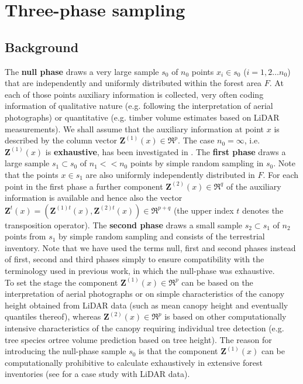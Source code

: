 \documentclass[a4paper,12pt,leqno, titlepage]{article}
\begin{document}
 \clearpage \newpage
\section{Three-phase sampling}\label{threephase}
\subsection{Background}\label{background}
The \textbf{null phase} draws a very large sample $s_0$ of $n_0$ points
$x_{i}\in{s_0}$ ($i=1,2\ldots n_0$) that are independently and uniformly distributed
within the forest area $F$. At each of those points auxiliary
information is collected, very often coding information of qualitative nature
(e.g. following the  interpretation of aerial photographs) or quantitative (e.g. timber volume estimates  based on LiDAR measurements). We shall assume that the auxiliary information at point $x$
is described by the column vector $\pmb{Z}^{(1)}(x)\in{\Re^p}$. The case $n_0=\infty$, i.e. $\pmb{Z}^{(1)}(x)$ is  \textbf{exhaustive}, has been investigated in \cite{mandallaz4}. The \textbf{first phase} draws a large sample $s_1 \subset s_0$ of $n_1 <<n_0$ points by simple random sampling in $s_0$. Note that the points $x\in{s_1}$ are also uniformly independently distributed in $F$. For each point in the first phase a further component $\pmb{Z}^{(2)}(x)\in{\Re^q}$ of the auxiliary information is available and hence also the vector $\pmb{Z}^t(x)=(\pmb{Z}^{(1)t}(x),\pmb{Z}^{(2)t}(x))\in{\Re^{p+q}}$ (the upper index $t$ denotes the transposition operator). The \textbf{second phase} draws a small sample $s_2\subset{s_1}$ of
$n_2$ points from $s_1$ by simple random sampling and consists of the terrestrial inventory. Note that we have used the terms null, first and second phases instead of first, second and third phases simply to ensure compatibility with the terminology used in previous work, in which the null-phase was exhaustive.\\
To set the stage the component $\pmb{Z}^{(1)}(x)\in{\Re^p}$ can be based on the interpretation of aerial photographs or on simple characteristics of the canopy height obtained from LiDAR data (such as mean canopy height and eventually quantiles thereof), whereas $\pmb{Z}^{(2)}(x)\in{\Re^p}$ is based on other computationally intensive characteristics of the canopy requiring individual tree detection (e.g. tree species ortree volume prediction based on tree height).
The reason for introducing the null-phase sample $s_0$ is that the component $\pmb{Z}^{(1)}(x)$ can be computationally  prohibitive to calculate exhaustively in extensive forest inventories (see \cite{mandallaz3} for a case study with LiDAR data).
\end{document}
